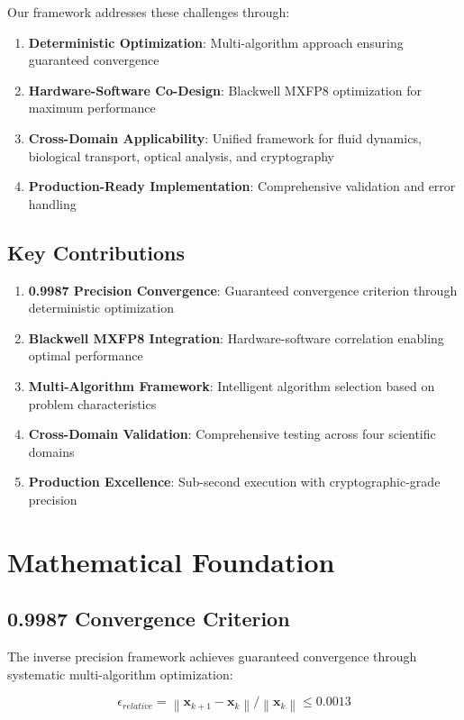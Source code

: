 \documentclass[11pt,a4paper]{article}
\begin{document}
Our framework addresses these challenges through:

\begin{enumerate}
    \item \textbf{Deterministic Optimization}: Multi-algorithm approach ensuring guaranteed convergence
    \item \textbf{Hardware-Software Co-Design}: Blackwell MXFP8 optimization for maximum performance
    \item \textbf{Cross-Domain Applicability}: Unified framework for fluid dynamics, biological transport, optical analysis, and cryptography
    \item \textbf{Production-Ready Implementation}: Comprehensive validation and error handling
\end{enumerate}

\subsection{Key Contributions}

\begin{enumerate}
    \item \textbf{0.9987 Precision Convergence}: Guaranteed convergence criterion through deterministic optimization
    \item \textbf{Blackwell MXFP8 Integration}: Hardware-software correlation enabling optimal performance
    \item \textbf{Multi-Algorithm Framework}: Intelligent algorithm selection based on problem characteristics
    \item \textbf{Cross-Domain Validation}: Comprehensive testing across four scientific domains
    \item \textbf{Production Excellence}: Sub-second execution with cryptographic-grade precision
\end{enumerate}

\section{Mathematical Foundation}

\subsection{0.9987 Convergence Criterion}

The inverse precision framework achieves guaranteed convergence through systematic multi-algorithm optimization:

\begin{equation}
\epsilon_{relative} = \left\| \mathbf{x}_{k+1} - \mathbf{x}_k \right\| / \left\| \mathbf{x}_k \right\| \leq 0.0013
\end{equation}
\end{document}
